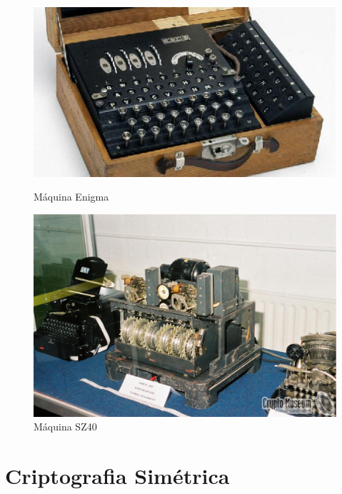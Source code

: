 \begin{figure}[h]
\centering
\begin{minipage}{.5\textwidth}
  \centering
  \includegraphics[keepaspectratio=true,scale=1]
  {figuras/enigma.eps}
  \caption[{Máquina Enigma}]{Máquina Enigma\protect\footnotemark}
  \label{enigma-machine}
\end{minipage}%
\begin{minipage}{.5\textwidth}
  \centering
  \includegraphics[keepaspectratio=true,scale=0.1]
  {figuras/sz40.eps}
  \caption[{Máquina SZ40}]{Máquina SZ40\protect\footnotemark}
    \label{sz40-machine}
\end{minipage}
\end{figure}
%

\section{Criptografia Simétrica}
\label{symmetric-cryptography}

